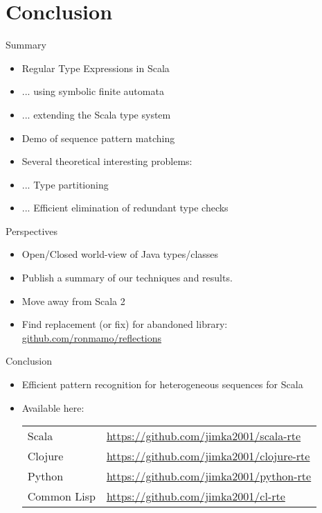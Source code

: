 \section{Conclusion}

{  %
\begin{frame}{Summary}
  \begin{itemize}
  \item Regular Type Expressions in Scala
  \item ... using symbolic finite automata
  \item ... extending the Scala type system
  \item Demo of sequence pattern matching
  \item Several theoretical interesting problems:
  \item ... Type partitioning
  \item ... Efficient elimination of redundant type checks
  \end{itemize}
\end{frame}
}

\begin{frame}{Perspectives}
  \begin{itemize}
  \item Open/Closed world-view of Java types/classes
  \item Publish a summary of our techniques and results.
  \item Move away from Scala 2
  \item Find replacement (or fix) for abandoned library:   \url{github.com/ronmamo/reflections}
  \end{itemize}
\end{frame}

\begin{frame}{Conclusion}
  \begin{itemize}
  \item Efficient pattern recognition for heterogeneous sequences for Scala
  \item Available here:

    \medskip
    
    \begin{tabular}{ll}
    Scala & \url{https://github.com/jimka2001/scala-rte}\\
    Clojure & \url{https://github.com/jimka2001/clojure-rte}\\
    Python & \url{https://github.com/jimka2001/python-rte}\\
    Common Lisp & \url{https://github.com/jimka2001/cl-rte}    
  \end{tabular}
  \end{itemize}
\end{frame}

